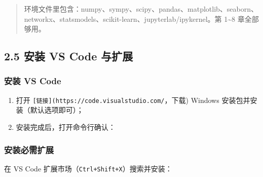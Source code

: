 \begin{Shaded}
\begin{Highlighting}[]
\OperatorTok{{-}}\OperatorTok{=} \OperatorTok{{-}}
\OperatorTok{{-}}
\end{Highlighting}
\end{Shaded}

\begin{quote}
环境文件里包含：numpy、sympy、scipy、pandas、matplotlib、seaborn、networkx、statsmodels、scikit-learn、jupyterlab/ipykernel。第
1\textasciitilde8 章全部够用。
\end{quote}

\subsection{2.5 安装 VS Code
与扩展}\label{ux5b89ux88c5-vs-code-ux4e0eux6269ux5c55}

\subsubsection{安装 VS Code}\label{ux5b89ux88c5-vs-code}

\begin{enumerate}
\def\labelenumi{\arabic{enumi}.}
\tightlist
\item
  打开 \texttt{{[}链接{]}(https://code.visualstudio.com/}，下载) Windows
  安装包并安装（默认选项即可）；
\item
  安装完成后，打开命令行确认：
\end{enumerate}

\begin{Shaded}
\begin{Highlighting}[]
\OperatorTok{{-}{-}}
\end{Highlighting}
\end{Shaded}

\subsubsection{安装必需扩展}\label{ux5b89ux88c5ux5fc5ux9700ux6269ux5c55}

在 VS Code 扩展市场（\texttt{Ctrl+Shift+X}）搜索并安装：

